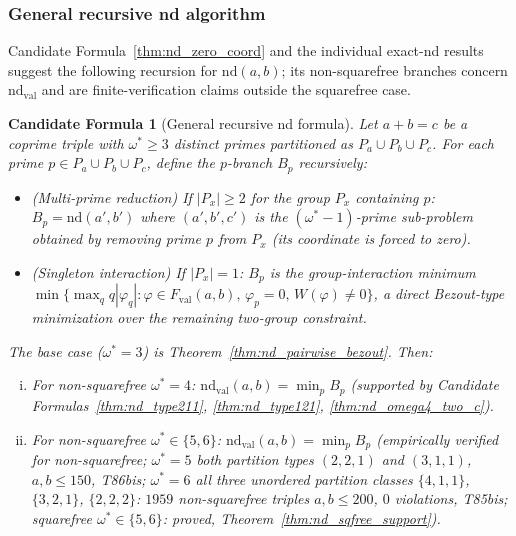 \documentclass[12pt]{article}
\newtheorem{candidate}{Candidate Formula}
\theoremstyle{definition}
\begin{document}
\subsubsection*{General recursive nd algorithm}

Candidate Formula~\ref{thm:nd_zero_coord} and the individual exact-nd results
suggest the following recursion for $\mathrm{nd}(a,b)$; its non-squarefree
branches concern $\mathrm{nd}_{\mathrm{val}}$ and are finite-verification claims
outside the squarefree case.

{\raggedright
\begin{candidate}[General recursive nd formula]\label{thm:nd_recursive}
  Let $a+b=c$ be a coprime triple with $\omega^*\ge 3$ distinct primes partitioned
  as $P_a\cup P_b\cup P_c$.  For each prime $p \in P_a\cup P_b\cup P_c$, define
  the \emph{$p$-branch} $B_p$ recursively:
  \begin{itemize}
    \item (Multi-prime reduction) If $|P_x| \ge 2$ for the group $P_x$ containing
      $p$: $B_p = \mathrm{nd}(a',b')$ where $(a',b',c')$ is the $(\omega^*-1)$-prime
      sub-problem obtained by removing prime $p$ from $P_x$
      (its coordinate is forced to zero).
    \item (Singleton interaction) If $|P_x| = 1$: $B_p$ is the group-interaction
      minimum $\min\{\max_q q|\varphi_q| : \varphi\in F_{\mathrm{val}}(a,b),\,\varphi_p=0,\,
      W(\varphi)\ne 0\}$, a direct Bezout-type minimization over the remaining
      two-group constraint.
  \end{itemize}
  The base case ($\omega^*=3$) is Theorem~\ref{thm:nd_pairwise_bezout}.  Then:
  \begin{enumerate}[(i)]
    \item For non-squarefree $\omega^*=4$:
      $\mathrm{nd}_{\mathrm{val}}(a,b) = \min_p B_p$ (supported by
      Candidate Formulas~\ref{thm:nd_type211}, \ref{thm:nd_type121},
      \ref{thm:nd_omega4_two_c}).
    \item For non-squarefree $\omega^*\in\{5,6\}$:
      $\mathrm{nd}_{\mathrm{val}}(a,b) = \min_p B_p$ (empirically
      verified for non-squarefree; $\omega^*=5$ both partition types $(2,2,1)$
      and $(3,1,1)$, $a,b\le 150$, T86bis;
      $\omega^*=6$ all three unordered partition classes $\{4,1,1\}$,
      $\{3,2,1\}$, $\{2,2,2\}$: $1959$ non-squarefree triples $a,b\le 200$,
      $0$ violations, T85bis;
      squarefree $\omega^*\in\{5,6\}$: proved,
      Theorem~\ref{thm:nd_sqfree_support}).
  \end{enumerate}
\end{candidate}
}
\end{document}
